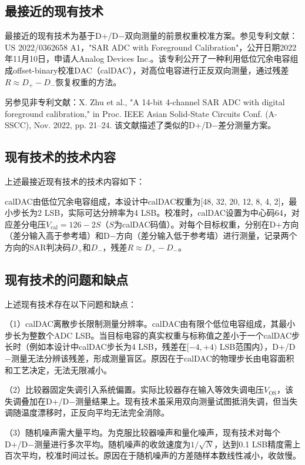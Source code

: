 \documentclass[UTF8,a4paper,11pt]{ctexart}
\begin{document}
\subsection{最接近的现有技术}

最接近的现有技术为基于D+/D$-$双向测量的前景权重校准方案。参见专利文献：US 2022/0362658 A1，"SAR ADC with Foreground Calibration"，公开日期2022年11月10日，申请人Analog Devices Inc.。该专利公开了一种利用低位冗余电容组成offset-binary校准DAC（calDAC），对高位电容进行正反双向测量，通过残差$R \approx D_+ - D_-$恢复权重的方法。

另参见非专利文献：X. Zhu et al., "A 14-bit 4-channel SAR ADC with digital foreground calibration," in Proc. IEEE Asian Solid-State Circuits Conf. (A-SSCC), Nov. 2022, pp. 21--24. 该文献描述了类似的D+/D$-$差分测量方案。

\subsection{现有技术的技术内容}

上述最接近现有技术的技术内容如下：

calDAC由低位冗余电容组成，本设计中calDAC权重为[48, 32, 20, 12, 8, 4, 2]，最小步长为2 LSB，实际可达分辨率为4 LSB。校准时，calDAC设置为中心码64，对应差分电压$V_{\mathrm{cal}} = 126 - 2S$（$S$为calDAC码值）。对每个目标权重，分别在D+方向（差分输入高于参考墙）和D$-$方向（差分输入低于参考墙）进行测量，记录两个方向的SAR判决码$D_+$和$D_-$，残差$R \approx D_+ - D_-$。

\subsection{现有技术的问题和缺点}

上述现有技术存在以下问题和缺点：

（1）calDAC离散步长限制测量分辨率。calDAC由有限个低位电容组成，其最小步长为整数个ADC LSB。当目标电容的真实权重与标称值之差小于一个calDAC步长时（例如本设计中calDAC步长为4 LSB，残差在$[-4, +4)$ LSB范围内），D+/D$-$测量无法分辨该残差，形成测量盲区。原因在于calDAC的物理步长由电容面积和工艺决定，无法无限减小。

（2）比较器固定失调引入系统偏置。实际比较器存在输入等效失调电压$V_{\mathrm{OS}}$，该失调叠加在D+/D$-$测量结果上。现有技术虽采用双向测量试图抵消失调，但当失调随温度漂移时，正反向平均无法完全消除。

（3）随机噪声需大量平均。为克服比较器噪声和量化噪声，现有技术对每个D+/D$-$测量进行多次平均。随机噪声的收敛速度为$1/\sqrt{N}$，达到0.1 LSB精度需上百次平均，校准时间过长。原因在于随机噪声的方差随样本数线性减小，收敛慢。
\end{document}
